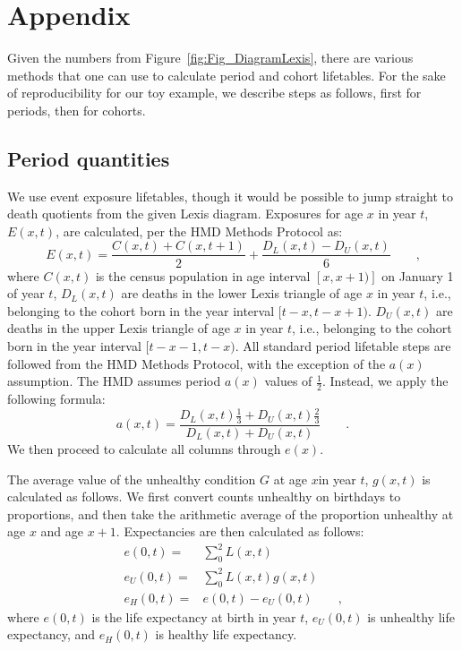 \documentclass[11pt,oneside,a4paper]{article} %
\newcommand{\tc}{\quad\quad\text{,}}
\newcommand{\tp}{\quad\quad\text{.}}
\begin{document}
\section{Appendix}

Given the numbers from Figure~\ref{fig:Fig_DiagramLexis}, there are various methods that one can use to
calculate period and cohort lifetables. For the sake of reproducibility for our
toy example, we describe steps as follows, first for periods, then for cohorts.
\subsection{Period quantities}
We use event exposure lifetables, though it would be possible to jump straight
to death quotients from the given Lexis diagram.
Exposures for age $x$ in year $t$, $E(x,t)$, are calculated, per the HMD Methods
Protocol \citep{Wilmoth2007} as:
\begin{equation}
E(x,t) = \frac{C(x,t) + C(x,t+1)}{2} + \frac{D_L(x,t) - D_U(x,t)}{6} \tc
\end{equation}
where $C(x,t)$ is the census population in age interval $[x,x+1)]$ on January 1
of year $t$, $D_L(x,t)$ are deaths in the lower Lexis triangle of age $x$ in
year $t$, i.e., belonging to the cohort born in the year interval $[t-x,t-x+1)$.
$D_U(x,t)$ are deaths in the upper Lexis triangle of age $x$ in
year $t$, i.e., belonging to the cohort born in the year interval
$[t-x-1,t-x)$. All standard period lifetable steps are followed from the HMD
Methods Protocol, with the exception of the $a(x)$ assumption. The HMD assumes period $a(x)$
values of $\frac{1}{2}$. Instead, we apply the following formula:
\begin{equation}
a(x,t) = \frac{D_L(x,t)\frac{1}{3} + D_U(x,t)\frac{2}{3}}{D_L(x,t) + D_U(x,t)}
\tp
\end{equation}
We then proceed to calculate all columns through $e(x)$. 

The average value of the unhealthy condition $G$ at age $x$in year $t$, $g(x,t)$
is calculated as follows. We first convert counts unhealthy on birthdays to
proportions, and then take the arithmetic average of the proportion unhealthy at
age $x$ and age $x+1$. Expectancies are then calculated as follows:
\begin{align}
e(0,t) =&\sum _0^2 L(x,t) \\
e_U(0,t) =&\sum _0^2 L(x,t) g(x,t) \\
e_H(0,t) =& e(0,t) - e_U(0,t) \tc
\end{align}
where $e(0,t)$ is the life expectancy at birth in year $t$, $e_U(0,t)$ is
unhealthy life expectancy, and $e_H(0,t)$ is healthy life expectancy.
\end{document}

